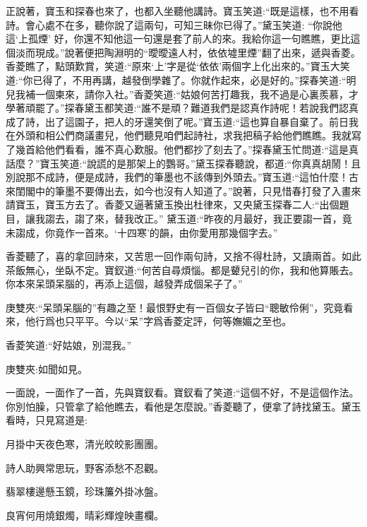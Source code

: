 \begin{parag}
    正說著，寶玉和探春也來了，也都入坐聽他講詩。寶玉笑道:“既是這樣，也不用看詩。會心處不在多，聽你說了這兩句，可知三昧你已得了。”黛玉笑道: “你說他這‘上孤煙’ 好，你還不知他這一句還是套了前人的來。我給你這一句瞧瞧，更比這個淡而現成。”說著便把陶淵明的“曖曖遠人村，依依墟里煙”翻了出來，遞與香菱。香菱瞧了，點頭歎賞，笑道:“原來‘上’字是從‘依依’兩個字上化出來的。”寶玉大笑道:“你已得了，不用再講，越發倒學雜了。你就作起來，必是好的。”探春笑道:“明兒我補一個柬來，請你入社。”香菱笑道:“姑娘何苦打趣我，我不過是心裏羨慕，才學著頑罷了。”探春黛玉都笑道:“誰不是頑？難道我們是認真作詩呢！若說我們認真成了詩，出了這園子，把人的牙還笑倒了呢。”寶玉道:“這也算自暴自棄了。前日我在外頭和相公們商議畫兒，他們聽見咱們起詩社，求我把稿子給他們瞧瞧。我就寫了幾首給他們看看，誰不真心歎服。他們都抄了刻去了。”探春黛玉忙問道:“這是真話麼？”寶玉笑道:“說謊的是那架上的鸚哥。”黛玉探春聽說，都道:“你真真胡鬧！且別說那不成詩，便是成詩，我們的筆墨也不該傳到外頭去。”寶玉道:“這怕什麼！古來閨閣中的筆墨不要傳出去，如今也沒有人知道了。”說著，只見惜春打發了入畫來請寶玉，寶玉方去了。香菱又逼著黛玉換出杜律來，又央黛玉探春二人:“出個題目，讓我謅去，謅了來，替我改正。” 黛玉道:“昨夜的月最好，我正要謅一首，竟未謅成，你竟作一首來。‘十四寒’的韻，由你愛用那幾個字去。”
\end{parag}


\begin{parag}
    香菱聽了，喜的拿回詩來，又苦思一回作兩句詩，又捨不得杜詩，又讀兩首。如此茶飯無心，坐臥不定。寶釵道:“何苦自尋煩惱。都是顰兒引的你，我和他算賬去。你本來呆頭呆腦的，再添上這個，越發弄成個呆子了。”\begin{note}庚雙夾:“呆頭呆腦的”有趣之至！最恨野史有一百個女子皆曰“聰敏伶俐”，究竟看來，他行爲也只平平。今以“呆”字爲香菱定評，何等嫵媚之至也。\end{note}香菱笑道:“好姑娘，別混我。”\begin{note}庚雙夾:如聞如見。\end{note}一面說，一面作了一首，先與寶釵看。寶釵看了笑道:“這個不好，不是這個作法。你別怕臊，只管拿了給他瞧去，看他是怎麼說。”香菱聽了，便拿了詩找黛玉。黛玉看時，只見寫道是:
\end{parag}


\begin{poem}
    \begin{pl}月掛中天夜色寒，清光皎皎影團團。\end{pl}

    \begin{pl}詩人助興常思玩，野客添愁不忍觀。\end{pl}

    \begin{pl}翡翠樓邊懸玉鏡，珍珠簾外掛冰盤。\end{pl}

    \begin{pl}良宵何用燒銀燭，晴彩輝煌映畫欄。\end{pl}
\end{poem}



